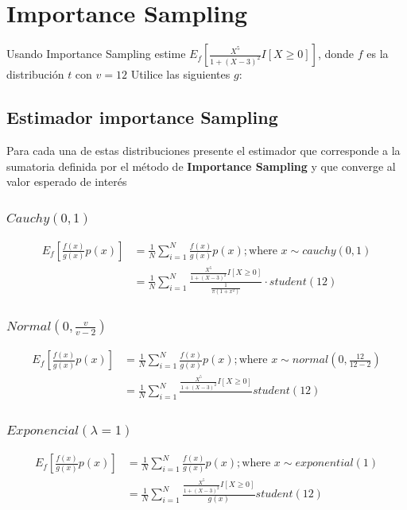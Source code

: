 \documentclass{article}
\begin{document}
\section{Importance Sampling}

Usando Importance Sampling estime $E_f\left[ \frac{X^5}{1+(X - 3)^2}I[X \ge 0] \right]$, donde $f$ es la
distribución $t$ con $v=12$ Utilice las siguientes $g$:

\subsection{Estimador importance Sampling}
Para cada una de estas distribuciones presente el estimador que corresponde a la sumatoria definida
por el método de \textbf{Importance Sampling} y que converge al valor esperado de interés
\subsubsection{$Cauchy(0,1)$}
\[
	\begin{split}
		E_f\left[\frac{f(x)}{g(x)}p(x)\right] & = \frac{1}{N}\sum_{i=1}^{N}\frac{f(x)}{g(x)}p(x) ; \text{where } x \sim cauchy(0,1)                             \\
		                                      & = \frac{1}{N}\sum_{i=1}^{N}\frac{\frac{X^5}{1+(X - 3)^2}I[X \ge 0] }{\frac{1}{\pi (1 + x^2)}} \cdot student(12)
	\end{split}
\]
\subsubsection{$Normal(0, \frac{v}{v-2})$}
\[
	\begin{split}
		E_f\left[\frac{f(x)}{g(x)}p(x)\right] & = \frac{1}{N}\sum_{i=1}^{N}\frac{f(x)}{g(x)}p(x) ; \text{where } x \sim normal(0,\frac{12}{12-2}) \\
		                                      & = \frac{1}{N}\sum_{i=1}^{N}\frac{\frac{X^5}{1+(X - 3)^2}I[X \ge 0] }{}student(12)
	\end{split}
\]
\subsubsection{$Exponencial(\lambda=1)$}
\[
	\begin{split}
		E_f\left[\frac{f(x)}{g(x)}p(x)\right] & = \frac{1}{N}\sum_{i=1}^{N}\frac{f(x)}{g(x)}p(x) ; \text{where } x \sim exponential(1) \\
		                                      & = \frac{1}{N}\sum_{i=1}^{N}\frac{\frac{X^5}{1+(X - 3)^2}I[X \ge 0] }{g(x)}student(12)
	\end{split}
\]
\end{document}
